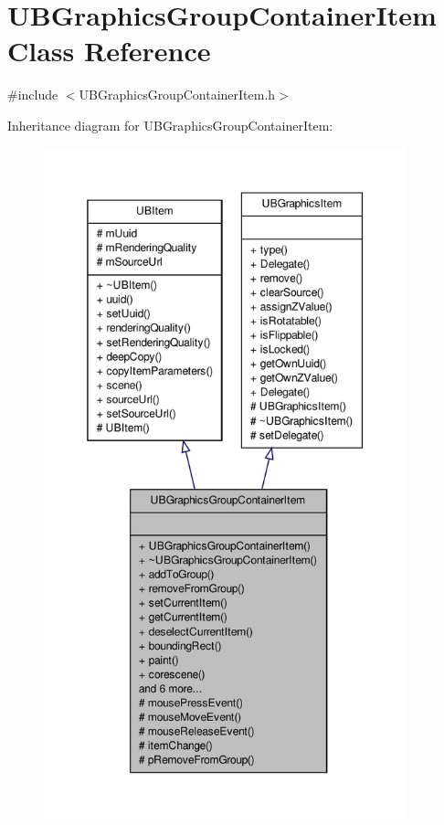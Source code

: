 \hypertarget{class_u_b_graphics_group_container_item}{\section{U\-B\-Graphics\-Group\-Container\-Item Class Reference}
\label{de/d93/class_u_b_graphics_group_container_item}
}


{\ttfamily \#include $<$U\-B\-Graphics\-Group\-Container\-Item.\-h$>$}



Inheritance diagram for U\-B\-Graphics\-Group\-Container\-Item\-:
\nopagebreak
\begin{figure}[H]
\begin{center}
\leavevmode
\includegraphics[height=550pt]{d4/ddc/class_u_b_graphics_group_container_item__inherit__graph}
\end{center}
\end{figure}


